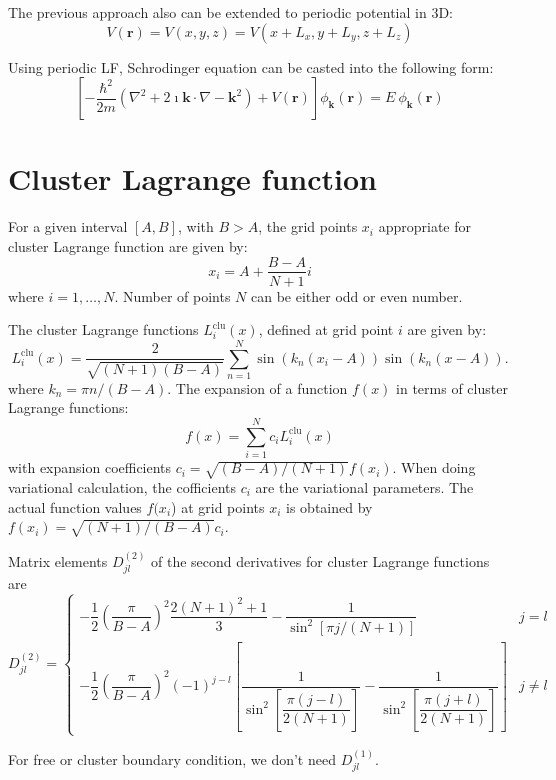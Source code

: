 The previous approach also can be extended to periodic potential in 3D:
\[
V(\mathbf{r})=V(x,y,z)=V\left(x+L_{x},y+L_{y},z+L_{z}\right)
\]

Using periodic LF, Schrodinger equation can be casted into the following form:
\begin{equation}
\left[-\dfrac{\hbar^{2}}{2m}\left(\nabla^{2}+2\imath\mathbf{k}\cdot\nabla-\mathbf{k}^{2}\right)+V(\mathbf{r})\right]\phi_{\mathbf{k}}(\mathbf{r})=E\ \phi_{\mathbf{k}}(\mathbf{r})
\end{equation}


\section{Cluster Lagrange function}

For a given interval $[A,B]$, with $B>A$, the grid points $x_{i}$
appropriate for cluster Lagrange function are given by:
\[
x_{i}=A+\frac{B-A}{N+1}i
\]
where $i=1,\ldots,N$. Number of points $N$ can be either odd or
even number.

The cluster Lagrange functions $L_{i}^{\mathrm{clu}}(x)$, defined
at grid point $i$ are given by:
\begin{equation}
L_{i}^{\mathrm{clu}}(x)=\frac{2}{\sqrt{(N+1)(B-A)}}\sum_{n=1}^{N}\sin\left(k_{n}(x_{i}-A)\right)\sin\left(k_{n}(x-A)\right).
\end{equation}
where $k_{n}=\pi n/(B-A)$. The expansion of a function $f(x)$ in
terms of cluster Lagrange functions:
\begin{equation}
f(x)=\sum_{i=1}^{N}c_{i}L_{i}^{\mathrm{clu}}(x)
\end{equation}
with expansion coefficients $c_{i}=\sqrt{(B-A)/(N+1)}f(x_{i})$. When
doing variational calculation, the cofficients $c_{i}$ are the variational
parameters. The actual function values $f(x_{i}$) at grid points
$x_{i}$ is obtained by $f(x_{i})=\sqrt{(N+1)/(B-A)}c_{i}$.

Matrix elements $D_{jl}^{(2)}$ of the second derivatives for cluster
Lagrange functions are
\begin{equation}
D_{jl}^{(2)}=\begin{cases}
-\dfrac{1}{2}\left(\dfrac{\pi}{B-A}\right)^{2}\dfrac{2(N+1)^{2}+1}{3}-\dfrac{1}{\sin^{2}\left[\pi j/(N+1)\right]} & j=l\\
-\dfrac{1}{2}\left(\dfrac{\pi}{B-A}\right)^{2}(-1)^{j-l}\left[\dfrac{1}{\sin^{2}\left[\dfrac{\pi(j-l)}{2(N+1)}\right]}-\dfrac{1}{\sin^{2}\left[\dfrac{\pi(j+l)}{2(N+1)}\right]}\right] & j\neq l
\end{cases}
\end{equation}

For free or cluster boundary condition, we don't need $D_{jl}^{(1)}$.
